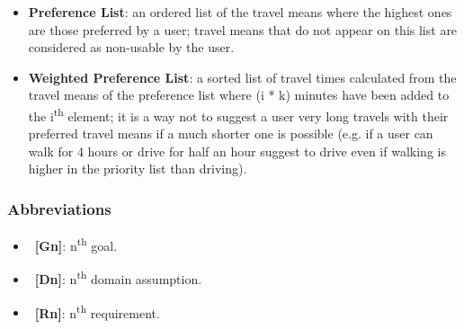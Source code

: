\begin{itemize}
\item \textbf{Preference List}: an ordered list of the travel means where the highest ones are those preferred by a user; travel means that do not appear on this list are considered as non-usable by the user.
\item \textbf{Weighted Preference List}: a sorted list of travel times calculated from the travel means of the preference list where (i * k) minutes have been added to the i\textsuperscript{th} element; it is a way not to suggest a user very long travels with their preferred travel means if a much shorter one is possible (e.g. if a user can walk for 4 hours or drive for half an hour suggest to drive even if walking is higher in the priority list than driving).
\end{itemize}

\subsubsection{Abbreviations}

\begin{itemize}
\item~\textbf{[Gn]}: n\textsuperscript{th} goal.
\item~\textbf{[Dn]}: n\textsuperscript{th} domain assumption.
\item~\textbf{[Rn]}: n\textsuperscript{th} requirement.
\end{itemize}